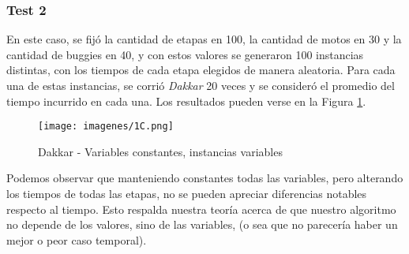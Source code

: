 \vspace*{0.6cm}

\subsubsection{Test 2}

En este caso, se fijó la cantidad de etapas en 100, la cantidad de motos en 30 y la cantidad de buggies en 40, y con estos valores se generaron 100 instancias distintas, con los tiempos de cada etapa elegidos de manera aleatoria.  Para cada una de estas instancias, se corrió {\it Dakkar} 20 veces y se consideró el promedio del tiempo incurrido en cada una.  Los resultados pueden verse en la Figura \ref{fig:1D}.

\begin{figure}[htb]
	\begin{center}
    		\texttt{[image: imagenes/1C.png]}
	\end{center}
	\caption{Dakkar - Variables constantes, instancias variables}\label{fig:1D}
\end{figure}

Podemos observar que manteniendo constantes todas las variables, pero alterando los tiempos de todas las etapas, no se pueden apreciar diferencias notables respecto al tiempo. Esto respalda nuestra teoría acerca de que nuestro algoritmo no depende de los valores, sino de las variables, (o sea que no parecería haber un mejor o peor caso temporal).